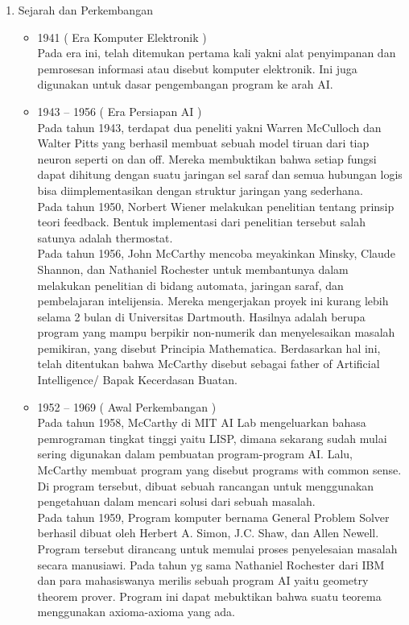\begin{enumerate}
	\item Sejarah dan Perkembangan
	\begin{itemize}
		\item 1941 ( Era Komputer Elektronik )\\
    Pada era ini, telah ditemukan pertama kali yakni alat penyimpanan dan pemrosesan informasi atau disebut komputer elektronik. Ini juga digunakan untuk dasar pengembangan program ke arah AI.
    \item 1943 – 1956 ( Era Persiapan AI )\\
    Pada tahun 1943, terdapat dua peneliti yakni Warren McCulloch dan Walter Pitts yang berhasil membuat sebuah model tiruan dari tiap neuron seperti on dan off. Mereka membuktikan bahwa setiap fungsi dapat dihitung dengan suatu jaringan sel saraf dan semua hubungan logis bisa diimplementasikan dengan struktur jaringan yang sederhana.\\
    Pada tahun 1950, Norbert Wiener melakukan penelitian tentang prinsip teori feedback. Bentuk implementasi dari penelitian tersebut salah satunya adalah thermostat.\\
    Pada tahun 1956, John McCarthy mencoba meyakinkan Minsky, Claude Shannon, dan Nathaniel Rochester untuk membantunya dalam melakukan penelitian di bidang automata, jaringan saraf, dan pembelajaran intelijensia. Mereka mengerjakan proyek ini kurang lebih selama 2 bulan di Universitas Dartmouth. Hasilnya adalah berupa program yang mampu berpikir non-numerik dan menyelesaikan masalah pemikiran, yang disebut Principia Mathematica. Berdasarkan hal ini, telah ditentukan bahwa McCarthy disebut sebagai father of Artificial Intelligence/ Bapak Kecerdasan Buatan.
    \item 1952 – 1969 ( Awal Perkembangan )\\
    Pada tahun 1958, McCarthy di MIT AI Lab mengeluarkan bahasa pemrograman tingkat tinggi yaitu LISP, dimana sekarang sudah mulai sering digunakan dalam pembuatan program-program AI. Lalu, McCarthy membuat program yang disebut programs with common sense. Di program tersebut, dibuat sebuah rancangan untuk menggunakan pengetahuan dalam mencari solusi dari sebuah masalah.\\
    Pada tahun 1959, Program komputer bernama General Problem Solver berhasil dibuat oleh Herbert A. Simon, J.C. Shaw, dan Allen Newell. Program tersebut dirancang untuk memulai proses penyelesaian masalah secara manusiawi. Pada tahun yg sama Nathaniel Rochester dari IBM dan para mahasiswanya merilis sebuah program AI yaitu geometry theorem prover. Program ini dapat mebuktikan bahwa suatu teorema menggunakan axioma-axioma yang ada.\\

\end{itemize}
\end{enumerate}
